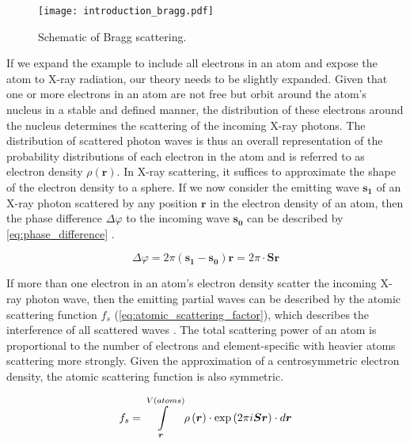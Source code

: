 \begin{figure}[H]
    \centering
    \texttt{[image: introduction\_bragg.pdf]}
    \caption{Schematic of Bragg scattering.}
    \label{fig:introduction_bragg}
\end{figure}

If we expand the example to include all electrons in an atom and expose the atom to X-ray radiation, our theory needs to be slightly expanded. Given that one or more electrons in an atom are not free but orbit around the atom's nucleus in a stable and defined manner, the distribution of these electrons around the nucleus determines the scattering of the incoming X-ray photons. The distribution of scattered photon waves is thus an overall representation of the probability distributions of each electron in the atom and is referred to as electron density $\rho(\boldsymbol{r})$. In X-ray scattering, it suffices to approximate the shape of the electron density to a sphere. If we now consider the emitting wave $\boldsymbol{s_1}$ of an X-ray photon scattered by any position $\boldsymbol{r}$ in the electron density of an atom, then the phase difference $\Delta\varphi$ to the incoming wave $\boldsymbol{s_0}$ can be described by \cref{eq:phase_difference} \cite{Rupp2010-nc}.

\begin{equation}
    \Delta\varphi=2\pi\left(\boldsymbol{s_1}-\boldsymbol{s_0}\right)\boldsymbol{r}=2\pi \cdot \boldsymbol{S}\boldsymbol{r}
    \label{eq:phase_difference}
\end{equation}

If more than one electron in an atom's electron density scatter the incoming X-ray photon wave, then the emitting partial waves can be described by the atomic scattering function $f_s$ (\cref{eq:atomic_scattering_factor}), which describes the interference of all scattered waves \cite{Rupp2010-nc}. The total scattering power of an atom is proportional to the number of electrons and element-specific with heavier atoms scattering more strongly. Given the approximation of a centrosymmetric electron density, the atomic scattering function is also symmetric.

\begin{equation}
    f_s=\int\limits_{\boldsymbol{r}}^{V(atoms)}\rho\left(\boldsymbol{r}\right) \cdot \exp\left(2\pi\\i\boldsymbol{S}\boldsymbol{r}\right) \cdot d\boldsymbol{r}
    \label{eq:atomic_scattering_factor}
\end{equation}

